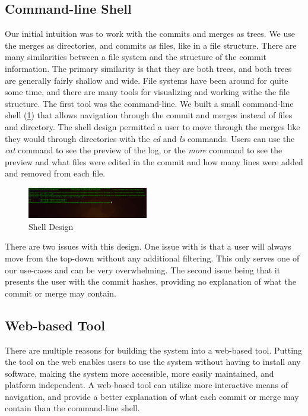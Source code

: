 \documentclass[conference, draftclsnofoot]{IEEEtran}
\begin{document}
\subsection{Command-line Shell}
Our initial intuition was to work with the commits and merges as trees. We use
the merges as directories, and commits as files, like in a file structure.
There are many similarities between a file system and the structure of the
commit information. The primary similarity is that they are both trees, and
both trees are generally fairly shallow and wide. File systems have been
around for quite some time, and there are many tools for visualizing and
working withe the file structure. The first tool was the command-line. We built
a small command-line shell (\ref{fig:shell}) that allows navigation through
the commit and merges instead of files and directory. The shell design
permitted a user to move through the merges like they would through
directories with the \textit{cd} and \textit{ls} commands. Users can use the
\textit{cat} command to see the preview of the log, or the \textit{more}
command to see the preview and what files were edited in the commit and how
many lines were added and removed from each file.

\begin{figure}[h]
        \centering
        \includegraphics[width=0.47\textwidth]{figures/shell.png}
        \caption{Shell Design}
        \label{fig:shell}
\end{figure}

There are two issues with this design. One issue with is that a user will
always move from the top-down without any additional filtering. This only
serves one of our use-cases and can be very overwhelming. The second issue
being that it presents the user with the commit hashes, providing no
explanation of what the commit or merge may contain.

\subsection{Web-based Tool}
There are multiple reasons for building the system into a web-based tool.
Putting the tool on the web enables users to use the system without having to
install any software, making the system more accessible, more easily
maintained, and platform independent. A web-based tool can utilize more
interactive means of navigation, and provide a better explanation of what each
commit or merge may contain than the command-line shell.
\end{document}
